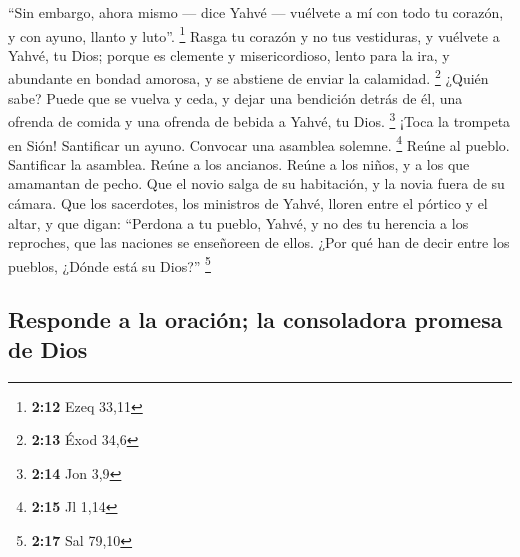  ``Sin embargo, ahora mismo --- dice Yahvé --- vuélvete a
mí con todo tu corazón, y con ayuno, llanto y luto''. \footnote{\textbf{2:12}
  Ezeq 33,11}  Rasga tu corazón y no tus vestiduras, y
vuélvete a Yahvé, tu Dios; porque es clemente y misericordioso, lento
para la ira, y abundante en bondad amorosa, y se abstiene de enviar la
calamidad. \footnote{\textbf{2:13} Éxod 34,6}  ¿Quién
sabe? Puede que se vuelva y ceda, y dejar una bendición detrás de él,
una ofrenda de comida y una ofrenda de bebida a Yahvé, tu Dios.
\footnote{\textbf{2:14} Jon 3,9}  ¡Toca la trompeta en
Sión! Santificar un ayuno. Convocar una asamblea solemne. \footnote{\textbf{2:15}
  Jl 1,14}  Reúne al pueblo. Santificar la asamblea.
Reúne a los ancianos. Reúne a los niños, y a los que amamantan de pecho.
Que el novio salga de su habitación, y la novia fuera de su cámara.
 Que los sacerdotes, los ministros de Yahvé, lloren entre
el pórtico y el altar, y que digan: ``Perdona a tu pueblo, Yahvé, y no
des tu herencia a los reproches, que las naciones se enseñoreen de
ellos. ¿Por qué han de decir entre los pueblos, ¿Dónde está su Dios?''
\footnote{\textbf{2:17} Sal 79,10}

\hypertarget{responde-a-la-oraciuxf3n-la-consoladora-promesa-de-dios}{%
\subsection{Responde a la oración; la consoladora promesa de
Dios}\label{responde-a-la-oraciuxf3n-la-consoladora-promesa-de-dios}}

